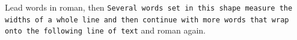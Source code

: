 \documentclass{article}
\begin{document}
Lead words in roman, then \texttt{Several words set in this shape measure the widths of a whole line and then continue with more words that wrap onto the following line of text} and roman again.
\end{document}
